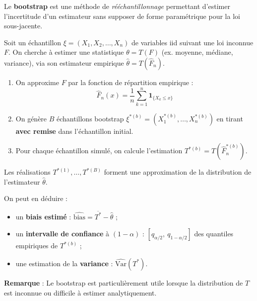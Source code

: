\begin{f}[Le bootstrap]
	
	Le \textbf{bootstrap} est une méthode de \textit{rééchantillonnage} permettant d’estimer l’incertitude d’un estimateur sans supposer de forme paramétrique pour la loi sous-jacente.
	
	Soit un échantillon $\xi = (X_1, X_2, \ldots, X_n)$ de variables iid suivant une loi inconnue $F$. On cherche à estimer une statistique $\theta = T(F)$ (ex. moyenne, médiane, variance), via son estimateur empirique $\hat{\theta} = T(\hat{F}_n)$.
	
	\begin{enumerate}
		\item On approxime $F$ par la fonction de répartition empirique :
		\[
		\hat{F}_n(x) = \frac{1}{n} \sum_{k=1}^n \mathbf{1}_{\{X_k \le x\}}
		\]
		
		\item On génère $B$ échantillons bootstrap $\xi^{\ast(b)} = (X_1^{\ast(b)}, \ldots, X_n^{\ast(b)})$ en tirant \textbf{avec remise} dans l’échantillon initial.
		
		\item Pour chaque échantillon simulé, on calcule l’estimation $T^{\ast(b)} = T(\hat{F}_n^{\ast(b)})$.
	\end{enumerate}
	
	Les réalisations $T^{\ast(1)}, \ldots, T^{\ast(B)}$ forment une approximation de la distribution de l’estimateur $\hat{\theta}$.
	
	On peut en déduire :
	\begin{itemize}[nosep]
		\item un \textbf{biais estimé} : $\widehat{\text{bias}} = \overline{T^\ast} - \hat{\theta}$ ;
		\item un \textbf{intervalle de confiance} à $(1-\alpha)$ : $[q_{\alpha/2},\ q_{1 - \alpha/2}]$ des quantiles empiriques de $T^{\ast(b)}$ ;
		\item une estimation de la \textbf{variance} : $\widehat{\mathrm{Var}}(T^\ast)$.
	\end{itemize}
	
	\textbf{Remarque} : Le bootstrap est particulièrement utile lorsque la distribution de $T$ est inconnue ou difficile à estimer analytiquement.
	
\end{f}
